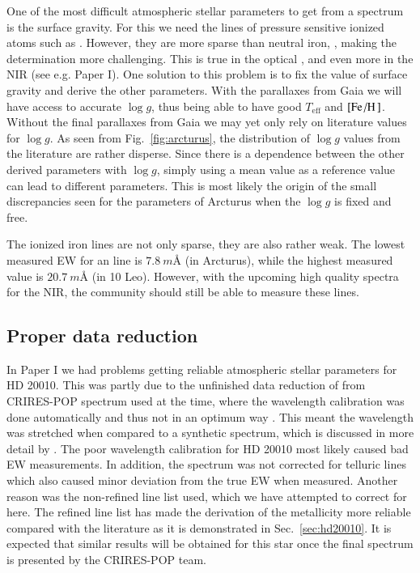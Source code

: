 \documentclass{aa}
\begin{document}
One of the most difficult atmospheric stellar parameters to get from a spectrum
is the surface gravity. For this we need the lines of pressure sensitive ionized
atoms such as . However, they are more sparse than neutral iron,
, making the determination more challenging. This is true in the
optical \citep[see e.g. the discussion by][]{Mortier2013c}, and even more in the
NIR (see e.g. Paper I). One solution to this problem is to fix the value of
surface gravity and derive the other parameters. With the parallaxes from Gaia
\citep{GAIA} we will have access to accurate $\log g$, thus being able to have
good $T_\mathrm{eff}$ and $[\ion{Fe}/\ion{H}]$. Without the final parallaxes
from Gaia we may yet only rely on literature values for $\log g$. As seen from
Fig.~\ref{fig:arcturus}, the distribution of $\log g$ values from the literature
are rather disperse. Since there is a dependence between the other derived
parameters with $\log g$, simply using a mean value as a reference value can
lead to different parameters. This is most likely the origin of the small
discrepancies seen for the parameters of Arcturus when the $\log g$ is fixed and
free.

The ionized iron lines are not only sparse, they are also rather weak. The
lowest measured EW for an  line is $\SI{7.8}{m}$\AA{} (in Arcturus),
while the highest measured value is $\SI{20.7}{m}$\AA{} (in 10 Leo). However,
with the upcoming high quality spectra for the NIR, the community should still
be able to measure these  lines.


\subsection{Proper data reduction}

In Paper I we had problems getting reliable atmospheric stellar parameters for
HD 20010. This was partly due to the unfinished data reduction of from
CRIRES-POP spectrum used at the time, where the wavelength calibration was done
automatically and thus not in an optimum way \citep[see][]{Nicholls2016}. This
meant the wavelength was stretched when compared to a synthetic spectrum, which
is discussed in more detail by \citet{Nicholls2016}. The poor wavelength
calibration for HD 20010 most likely caused bad EW measurements. In addition,
the spectrum was not corrected for telluric lines which also caused minor
deviation from the true EW when measured. Another reason was the non-refined
line list used, which we have attempted to correct for here. The refined line
list has made the derivation of the metallicity more reliable compared with the
literature as it is demonstrated in Sec.~\ref{sec:hd20010}. It is expected that
similar results will be obtained for this star once the final spectrum is
presented by the CRIRES-POP team.
\end{document}
